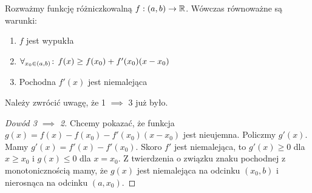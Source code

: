\documentclass[9pt]{article}
\begin{document}
\begin{Twi}
    Rozważmy funkcję różniczkowalną $f: (a,b) \to \mathbb{R}$. Wówczas równoważne są warunki:
    \begin{enumerate}
        \item $f$ jest wypukła
        \item $\forall_{x_0 \in (a,b)} \! : \, f(x) \ge f(x_0) + f'(x_0)(x-x_0)$
        \item Pochodna $f'(x)$ jest niemalejąca
    \end{enumerate}
\end{Twi}

Należy zwrócić uwagę, że 1 $\implies$ 3 już było.

\begin{proof}[Dowód 3 $\implies$ 2]
    Chcemy pokazać, że funkcja $g(x) = f(x)-f(x_0) - f'(x_0) (x-x_0)$ jest nieujemna. Policzmy
    $g'(x)$. Mamy $g'(x) = f'(x) - f'(x_0)$. Skoro $f'$ jest niemalejąca, to $g'(x) \ge 0$ dla
    $x \ge x_0$ i $g(x) \le 0$ dla $x = x_0$. Z twierdzenia o związku znaku pochodnej z
    monotonicznością mamy, że $g(x)$ jest niemalejąca na odcinku $(x_0, b)$ i nierosnąca na odcinku
    $(a, x_0)$. 
\end{proof}
\end{document}
